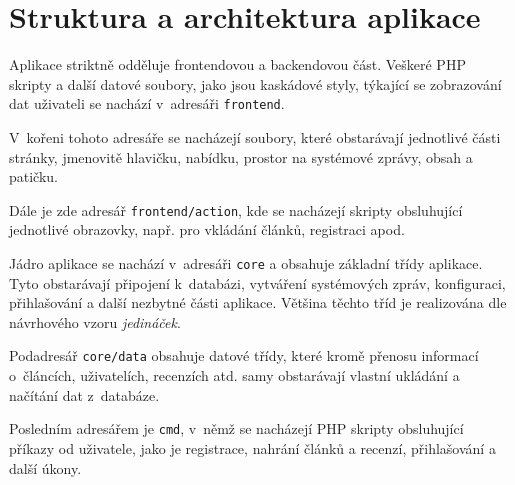 \section{Struktura a architektura aplikace}

Aplikace striktně odděluje frontendovou a backendovou část. Veškeré PHP skripty
a další datové soubory, jako jsou kaskádové styly, týkající se zobrazování dat
uživateli se nachází v~adresáři \verb|frontend|.

V~kořeni tohoto adresáře se nacházejí soubory, které obstarávají jednotlivé
části stránky, jmenovitě hlavičku, nabídku, prostor na systémové zprávy,
obsah a patičku.

Dále je zde adresář \verb|frontend/action|, kde se nacházejí skripty obsluhující
jednotlivé obrazovky, např. pro vkládání článků, registraci apod.

Jádro aplikace se nachází v~adresáři \verb|core| a obsahuje základní třídy
aplikace. Tyto obstarávají připojení k~databázi, vytváření systémových zpráv,
konfiguraci, přihlašování a další nezbytné části aplikace. Většina těchto tříd
je realizována dle návrhového vzoru \textit{jedináček}.

Podadresář \verb|core/data| obsahuje datové třídy, které kromě přenosu informací
o~článcích, uživatelích, recenzích atd. samy obstarávají vlastní ukládání
a načítání dat z~databáze.

Posledním adresářem je \verb|cmd|, v~němž se nacházejí PHP skripty obsluhující
příkazy od uživatele, jako je registrace, nahrání článků a recenzí, přihlašování
a další úkony.
